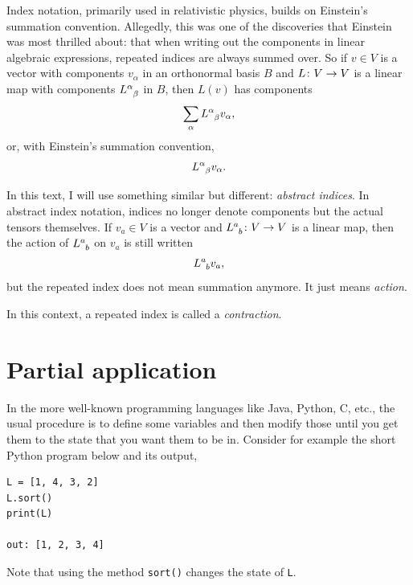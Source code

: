 \documentclass[english, 12pt]{article}
\begin{document}
Index notation, primarily used in relativistic physics, builds on Einstein's summation convention.
Allegedly, this was one of the discoveries that Einstein was most thrilled about: that when writing out the components in linear algebraic expressions, repeated indices are always summed over.
So if $v \in V$ is a vector with components $v_\alpha$ in an orthonormal basis $B$ and $L \colon V \to V$ is a linear map with components $\tensor{L}{^\alpha_\beta}$ in $B$, then $L(v)$ has components
\begin{align*}
	\sum_\alpha \tensor{L}{^\alpha_\beta} v_\alpha,
\end{align*}
or, with Einstein's summation convention,
\begin{align*}
	\tensor{L}{^\alpha_\beta} v_\alpha.
\end{align*}

In this text, I will use something similar but different: \emph{abstract indices}.
In abstract index notation, indices no longer denote components but the actual tensors themselves.
If $v_a \in V$ is a vector and $\tensor{L}{^a_b} \from V \to V$ is a linear map, then the action of $\tensor{L}{^a_b}$ on $v_a$ is still written
\begin{align*}
	\tensor{L}{^a_b} v_a,
\end{align*}
but the repeated index does not mean summation anymore.
It just means \emph{action}.

In this context, a repeated index is called a \emph{contraction}.



\section{Partial application}%
\label{sec:partial_application}

In the more well-known programming languages like Java, Python, C, etc., the usual procedure is to define some variables and then modify those until you get them to the state that you want them to be in.
Consider for example the short Python program below and its output,
\begin{verbatim}
L = [1, 4, 3, 2]
L.sort()
print(L)

out: [1, 2, 3, 4]
\end{verbatim}
Note that using the method \verb|sort()| changes the state of \verb|L|.
\end{document}
